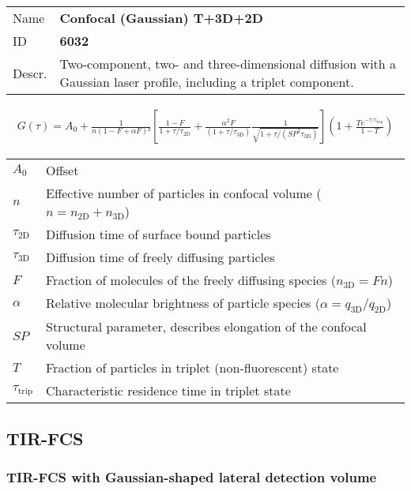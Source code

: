 \noindent \begin{tabular}{lp{}}
Name & \textbf{Confocal (Gaussian) T+3D+2D} \\ 
ID & \textbf{6032} \\ 
Descr. &  Two-component, two- and three-dimensional diffusion with a Gaussian laser profile, including a triplet component\cite{Elson1974, Aragon1976, Palmer1987}. \\ 
\end{tabular}
\begin{align}
G(\tau) = A_0 + \frac{1}{n (1 - F + \alpha F)²} \left[ \frac{1-F}{1+\tau/\tau_\mathrm{2D}} + \frac{ \alpha^2 F}{ (1+\tau/\tau_\mathrm{3D}) } \frac{1}{\sqrt{1+\tau/(\mathit{SP}^2 \tau_\mathrm{3D})}} \right] \left(1 + \frac{T e^{-\tau/\tau_\mathrm{trip}}}{1-T}  \right) 
\end{align} 
\begin{center}
\begin{tabular}{ll}
$A_0$ & Offset \\ 
$n$ & Effective number of particles in confocal volume ($n = n_\mathrm{2D}+n_\mathrm{3D}$) \\ 
$\tau_\mathrm{2D}$ &  Diffusion time of surface bound particles \\ 
$\tau_\mathrm{3D}$ &  Diffusion time of freely diffusing particles \\ 
$F$ & Fraction of molecules of the freely diffusing species ($n_\mathrm{3D} = F n$) \\
$\alpha$ & Relative molecular brightness of particle species ($ \alpha = q_\mathrm{3D}/q_\mathrm{2D}$) \\
$\mathit{SP}$ & Structural parameter, describes elongation of the confocal volume \\
$T$ &  Fraction of particles in triplet (non-fluorescent) state\\ 
$\tau_\mathrm{trip}$ &  Characteristic residence time in triplet state \\ 
\end{tabular}
\end{center}
\vspace{2em}


\subsection{TIR-FCS}
\label{sec:imple.tirfc}

\subsubsection{TIR-FCS with Gaussian-shaped lateral detection volume}

